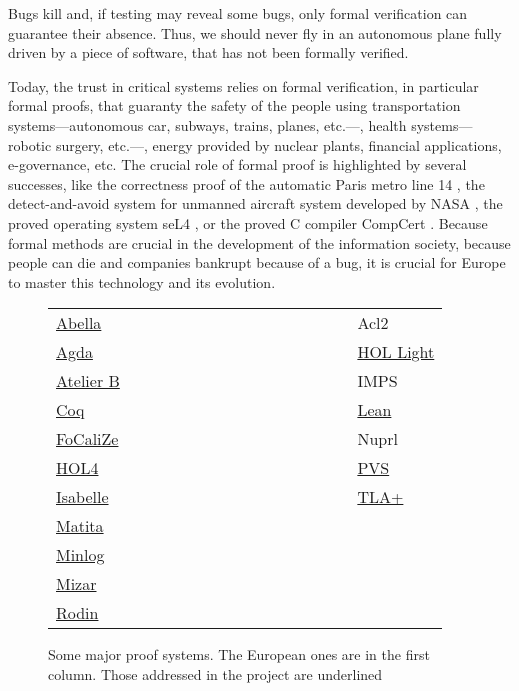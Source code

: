 Bugs kill and, if testing may reveal some bugs, only
formal verification can guarantee their absence.  Thus, we should
never fly in an autonomous plane fully driven by a piece of software,
that has not been formally verified.

Today, the trust in critical systems relies on formal verification, in
particular formal proofs, that guaranty the safety of the people using
transportation systems---autonomous car, subways, trains, planes,
etc.---, health systems---robotic surgery, etc.---, energy provided by
nuclear plants, financial applications, e-governance, etc. The crucial
role of formal proof is highlighted by several successes, like the
correctness proof of the automatic Paris metro line 14 \cite{metro14},
the detect-and-avoid system for unmanned aircraft system developed
by NASA \cite{Munoz16}, the proved operating system seL4 \cite{Klein09},
or the proved C compiler CompCert \cite{Leroy06}. Because formal methods are crucial in the
development of the information society, because people can die and
companies bankrupt because of a bug, it is crucial for Europe to
master this technology and its evolution.

\thispagestyle{empty}

\begin{figure}
\begin{tabular}{ll}
  {\sc \underline{Abella}}~~~~~~~~~~~~~~~~~~~~~~~~~~~~~~&{\sc Acl2}\\
{\sc \underline{Agda}} &  {\sc \underline{HOL Light}}\\
{\sc \underline{Atelier B}} &  {\sc IMPS}\\
{\sc \underline{Coq}}  &  {\sc \underline{Lean}}\\
{\sc \underline{FoCaliZe}}  &  {\sc Nuprl}\\
{\sc \underline{HOL4}}  &  {\sc \underline{PVS}}\\
{\sc \underline{Isabelle}}  &  {\sc \underline{TLA+}}\\
{\sc \underline{Matita}}\\
{\sc \underline{Minlog}}\\
{\sc \underline{Mizar}}\\
{\sc \underline{Rodin}}\\
\end{tabular}
\caption{Some major proof systems. The European ones are in the first column.
  Those addressed in the project are underlined\label{systems}}
\end{figure}

